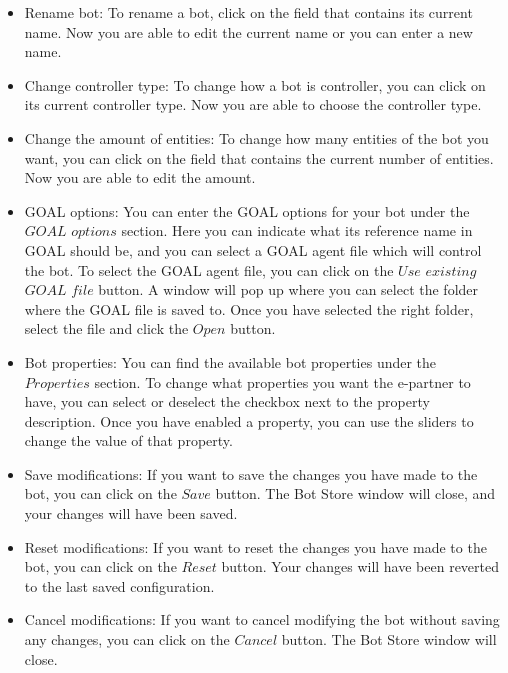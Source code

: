 \begin{itemize}
\item{Rename bot}:
To rename a bot, click on the field that contains its current name. Now you are able to edit the current name or you can enter a new name.

\item{Change controller type}:
To change how a bot is controller, you can click on its current controller type. Now you are able to choose the controller type.

\item{Change the amount of entities}:
To change how many entities of the bot you want, you can click on the field that contains the current number of entities. Now you are able to edit the amount.

\item{GOAL options}:
You can enter the GOAL options for your bot under the $GOAL$ $options$ section. Here you can indicate what its reference name in GOAL should be, and you can select a GOAL agent file which will control the bot. To select the GOAL agent file, you can click on the $Use$ $existing$ $GOAL$ $file$ button. A window will pop up where you can select the folder where the GOAL file is saved to. Once you have selected the right folder, select the file and click the $Open$ button.

\item{Bot properties}:
You can find the available bot properties under the $Properties$ section. To change what properties you want the e-partner to have, you can select or deselect the checkbox next to the property description. Once you have enabled a property, you can use the sliders to change the value of that property.

\item{Save modifications}:
If you want to save the changes you have made to the bot, you can click on the $Save$ button. The Bot Store window will close, and your changes will have been saved.

\item{Reset modifications}:
If you want to reset the changes you have made to the bot, you can click on the $Reset$ button. Your changes will have been reverted to the last saved configuration.

\item{Cancel modifications}:
If you want to cancel modifying the bot without saving any changes, you can click on the $Cancel$ button. The Bot Store window will close.
\end{itemize}


